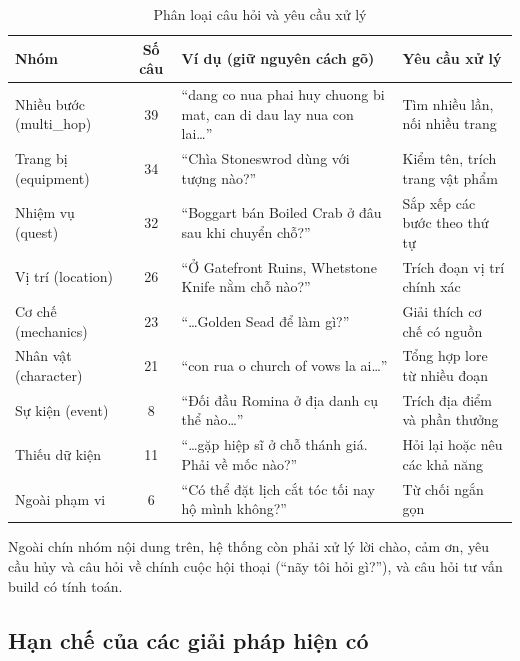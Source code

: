 \begin{table}[H]
    \centering
    \caption{Phân loại câu hỏi và yêu cầu xử lý}
    \label{tab:question_types}
    \small
    \begin{tabularx}{\textwidth}{|>{\raggedright\arraybackslash}p{2.6cm}|c|>{\raggedright\arraybackslash}X|>{\raggedright\arraybackslash}p{4.0cm}|}
        \toprule
        \textbf{Nhóm} & \textbf{Số câu} & \textbf{Ví dụ (giữ nguyên cách gõ)} & \textbf{Yêu cầu xử lý} \\
        \midrule
        Nhiều bước (multi\_hop) & 39 & ``dang co nua phai huy chuong bi mat, can di dau lay nua con lai\ldots'' & Tìm nhiều lần, nối nhiều trang \\ \hline
        Trang bị (equipment) & 34 & ``Chìa Stoneswrod dùng với tượng nào?'' & Kiểm tên, trích trang vật phẩm \\ \hline
        Nhiệm vụ (quest) & 32 & ``Boggart bán Boiled Crab ở đâu sau khi chuyển chỗ?'' & Sắp xếp các bước theo thứ tự \\ \hline
        Vị trí (location) & 26 & ``Ở Gatefront Ruins, Whetstone Knife nằm chỗ nào?'' & Trích đoạn vị trí chính xác \\ \hline
        Cơ chế (mechanics) & 23 & ``\ldots Golden Sead để làm gì?'' & Giải thích cơ chế có nguồn \\ \hline
        Nhân vật (character) & 21 & ``con rua o church of vows la ai\ldots'' & Tổng hợp lore từ nhiều đoạn \\ \hline
        Sự kiện (event) & 8 & ``Đối đầu Romina ở địa danh cụ thể nào\ldots'' & Trích địa điểm và phần thưởng \\ \hline
        Thiếu dữ kiện & 11 & ``\ldots gặp hiệp sĩ ở chỗ thánh giá. Phải về mốc nào?'' & Hỏi lại hoặc nêu các khả năng \\ \hline
        Ngoài phạm vi & 6 & ``Có thể đặt lịch cắt tóc tối nay hộ mình không?'' & Từ chối ngắn gọn \\
        \bottomrule
    \end{tabularx}
\end{table}

Ngoài chín nhóm nội dung trên, hệ thống còn phải xử lý lời chào, cảm ơn, yêu cầu hủy và câu hỏi về chính cuộc hội thoại (``nãy tôi hỏi gì?''), và câu hỏi tư vấn build có tính toán.

\subsection{Hạn chế của các giải pháp hiện có}
\label{sec:existing_limits}


